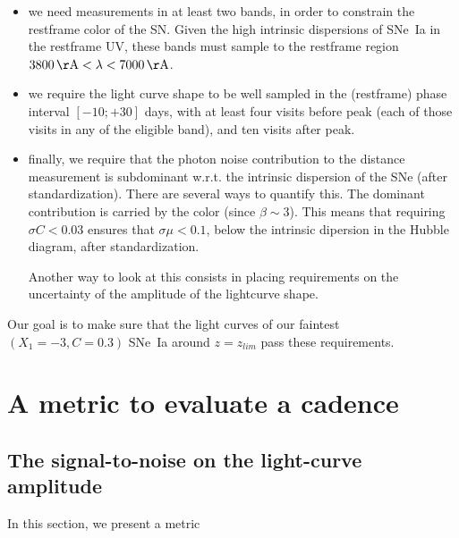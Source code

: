 \documentclass[\docopts]{\docclass}
\begin{document}
\begin{itemize}
\item we need measurements in at least two bands, in order to
  constrain the restframe color of the SN. Given the high intrinsic
  dispersions of SNe~Ia in the restframe UV, these bands must sample
  to the restframe region $3800 \angstrom < \lambda < 7000 \angstrom$.

\item we require the light curve shape to be well sampled in the
  (restframe) phase interval $[-10;+30]$ days, with at least four
  visits before peak (each of those visits in any of the eligible
  band), and ten visits after peak.
  
\item finally, we require that the photon noise contribution to the
  distance measurement is subdominant w.r.t. the intrinsic dispersion
  of the SNe (after standardization).  There are several ways to
  quantify this.  The dominant contribution is carried by the color
  (since $\beta \sim 3$). This means that requiring $\sigma C < 0.03$
  ensures that $\sigma \mu < 0.1$, below the intrinsic dipersion in
  the Hubble diagram, after standardization.

  Another way to look at this consists in placing requirements on the
  uncertainty of the amplitude of the lightcurve shape. 
\end{itemize}

Our goal is to make sure that the light curves of our faintest
$(X_1=-3, C=0.3)$ SNe~Ia around $z = z_{lim}$ pass these requirements.



\section{A metric to evaluate a cadence}
\label{sec:metric}



\subsection{The signal-to-noise on the light-curve amplitude}

In this section, we present a metric 
\end{document}
